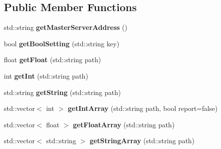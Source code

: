 \subsection*{Public Member Functions}
\begin{DoxyCompactItemize}
\item 
\hypertarget{class_config_loader_addf8fb5aaf787add654ee5974a62b777}{std\-::string {\bfseries get\-Master\-Server\-Address} ()}\label{class_config_loader_addf8fb5aaf787add654ee5974a62b777}

\item 
\hypertarget{class_config_loader_ab7752bd1a81576e9321f61ff738973f9}{bool {\bfseries get\-Bool\-Setting} (std\-::string key)}\label{class_config_loader_ab7752bd1a81576e9321f61ff738973f9}

\item 
\hypertarget{class_config_loader_ac024173b366a50a19ea8a863d794f9c9}{float {\bfseries get\-Float} (std\-::string path)}\label{class_config_loader_ac024173b366a50a19ea8a863d794f9c9}

\item 
\hypertarget{class_config_loader_ad0d4ff3a501dda28bbc0927a7d6a1c51}{int {\bfseries get\-Int} (std\-::string path)}\label{class_config_loader_ad0d4ff3a501dda28bbc0927a7d6a1c51}

\item 
\hypertarget{class_config_loader_ac5196238d89cf98aae6f3c920589c7b8}{std\-::string {\bfseries get\-String} (std\-::string path)}\label{class_config_loader_ac5196238d89cf98aae6f3c920589c7b8}

\item 
\hypertarget{class_config_loader_a568d30fd1a3ab5678276992ea2336461}{std\-::vector$<$ int $>$ {\bfseries get\-Int\-Array} (std\-::string path, bool report=false)}\label{class_config_loader_a568d30fd1a3ab5678276992ea2336461}

\item 
\hypertarget{class_config_loader_a734fe8920fd3eb2312588718eb93ad72}{std\-::vector$<$ float $>$ {\bfseries get\-Float\-Array} (std\-::string path)}\label{class_config_loader_a734fe8920fd3eb2312588718eb93ad72}

\item 
\hypertarget{class_config_loader_a5fdf796fa1858924264e1206a5d427ed}{std\-::vector$<$ std\-::string $>$ {\bfseries get\-String\-Array} (std\-::string path)}\label{class_config_loader_a5fdf796fa1858924264e1206a5d427ed}

\end{DoxyCompactItemize}
